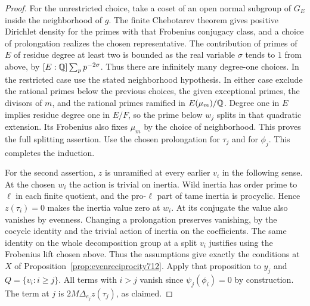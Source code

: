 \documentclass[a4paper,11pt]{article}
\theoremstyle{definition}
\theoremstyle{remark}
\numberwithin{equation}{section}
\begin{document}
\begin{proof}
For the unrestricted choice, take a coset of an open normal
subgroup of \(G_E\) inside the neighborhood of \(g\). The
finite Chebotarev theorem gives positive Dirichlet density
for the primes with that Frobenius conjugacy class, and a
choice of prolongation realizes the chosen representative.
The contribution of primes of \(E\) of residue degree at
least two is bounded as the real variable \(\sigma\) tends
to \(1\) from above, by \([E:\mathbb Q]\sum_p p^{-2\sigma}\). Thus
there are infinitely many degree-one choices. In the restricted
case use the stated neighborhood hypothesis. In either case
exclude the rational primes below the previous choices, the
given exceptional primes, the divisors of \(m\), and the
rational primes ramified in \(E(\mu_m)/\mathbb Q\). Degree one in
\(E\) implies residue degree one in \(E/F\), so the prime
below \(w_j\) splits in that quadratic extension. Its Frobenius
also fixes \(\mu_m\) by the choice of neighborhood. This proves
the full splitting assertion. Use the chosen prolongation for
\(\tau_j\) and for \(\phi_j\). This completes the induction.
\cite[Theorem~8.31]{II-II-II-chebotarev713}

For the second assertion, \(z\) is unramified at every earlier
\(v_i\) in the following sense. At the chosen \(w_i\) the
action is trivial on inertia. Wild inertia has order prime
to \(\ell\) in each finite quotient, and the pro-\(\ell\)
part of tame inertia is procyclic. Hence \(z(\tau_i)=0\)
makes the inertia value zero at \(w_i\). At its conjugate
the value also vanishes by evenness. Changing a prolongation
preserves vanishing, by the cocycle identity and the trivial
action of inertia on the coefficients. The same identity on
the whole decomposition group at a split \(v_i\) justifies
using the Frobenius lift chosen above. Thus the assumptions
give exactly the conditions at \(X\) of
Proposition~\ref{prop:evenreciprocity712}. Apply that proposition
to \(y_j\) and \(Q=\{v_i:i\ge j\}\). All terms with \(i>j\)
vanish since \(\psi_j(\phi_i)=0\) by construction. The term
at \(j\) is \(2M\Delta_{e_j}z(\tau_j)\), as claimed.
\end{proof}
\end{document}
